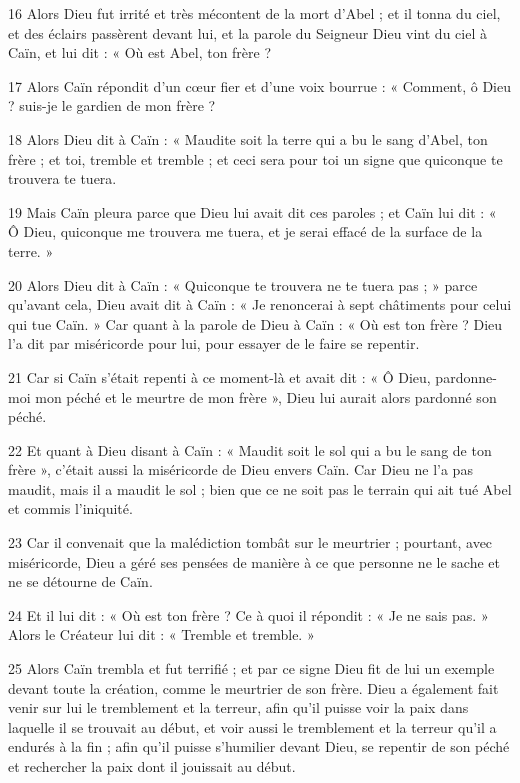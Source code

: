 \par 16 Alors Dieu fut irrité et très mécontent de la mort d'Abel ; et il tonna du ciel, et des éclairs passèrent devant lui, et la parole du Seigneur Dieu vint du ciel à Caïn, et lui dit : « Où est Abel, ton frère ?

\par 17 Alors Caïn répondit d'un cœur fier et d'une voix bourrue : « Comment, ô Dieu ? suis-je le gardien de mon frère ?

\par 18 Alors Dieu dit à Caïn : « Maudite soit la terre qui a bu le sang d'Abel, ton frère ; et toi, tremble et tremble ; et ceci sera pour toi un signe que quiconque te trouvera te tuera.

\par 19 Mais Caïn pleura parce que Dieu lui avait dit ces paroles ; et Caïn lui dit : « Ô Dieu, quiconque me trouvera me tuera, et je serai effacé de la surface de la terre. »

\par 20 Alors Dieu dit à Caïn : « Quiconque te trouvera ne te tuera pas ; » parce qu’avant cela, Dieu avait dit à Caïn : « Je renoncerai à sept châtiments pour celui qui tue Caïn. » Car quant à la parole de Dieu à Caïn : « Où est ton frère ? Dieu l'a dit par miséricorde pour lui, pour essayer de le faire se repentir.

\par 21 Car si Caïn s'était repenti à ce moment-là et avait dit : « Ô Dieu, pardonne-moi mon péché et le meurtre de mon frère », Dieu lui aurait alors pardonné son péché.

\par 22 Et quant à Dieu disant à Caïn : « Maudit soit le sol qui a bu le sang de ton frère », c'était aussi la miséricorde de Dieu envers Caïn. Car Dieu ne l'a pas maudit, mais il a maudit le sol ; bien que ce ne soit pas le terrain qui ait tué Abel et commis l'iniquité.

\par 23 Car il convenait que la malédiction tombât sur le meurtrier ; pourtant, avec miséricorde, Dieu a géré ses pensées de manière à ce que personne ne le sache et ne se détourne de Caïn.

\par 24 Et il lui dit : « Où est ton frère ? Ce à quoi il répondit : « Je ne sais pas. » Alors le Créateur lui dit : « Tremble et tremble. »

\par 25 Alors Caïn trembla et fut terrifié ; et par ce signe Dieu fit de lui un exemple devant toute la création, comme le meurtrier de son frère. Dieu a également fait venir sur lui le tremblement et la terreur, afin qu'il puisse voir la paix dans laquelle il se trouvait au début, et voir aussi le tremblement et la terreur qu'il a endurés à la fin ; afin qu'il puisse s'humilier devant Dieu, se repentir de son péché et rechercher la paix dont il jouissait au début.

